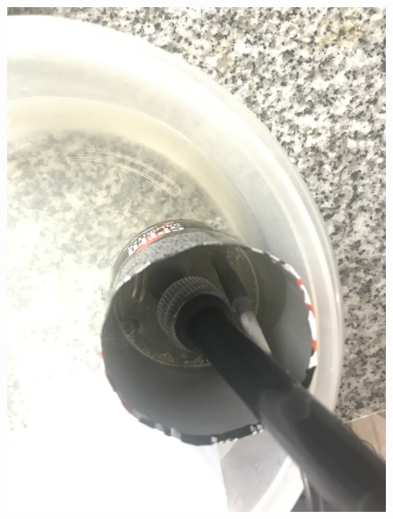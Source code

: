     \begin{figure}
        \centering
        \includegraphics[scale=0.1]{Anexo/FotosExperimentos/P8.jpg}
        \label{fig:MedicPH}
    \end{figure}
        

    

